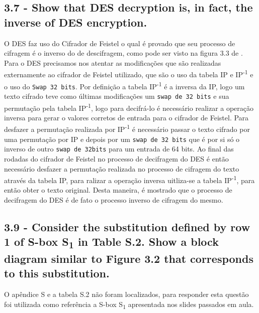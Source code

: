 \documentclass[
    article,            %
    11pt,               %
    oneside,            %
    a4paper,            %
    english,            %
    brazil,             %
    sumario=tradicional,
    ]{abntex2}
\begin{document}
\subsection*{\textbf{3.7 - Show that DES decryption is, in fact, the inverse of DES encryption.}}

O DES faz uso do Cifrador de Feistel o qual é provado que seu processo de cifragem é o inverso do de descifragem, como pode ser visto na figura 3.3 de \cite{Stallings:2005:CNS:1076613}. Para o DES precisamos nos atentar as modificações que são realizadas externamente ao cifrador de Feistel utilizado, que são o uso da tabela IP e IP\textsuperscript{-1} e o uso do \texttt{Swap 32 bits}. Por definição a tabela IP\textsuperscript{-1} é a inversa da IP, logo um texto cifrado teve como últimas modificações um \texttt{swap de 32 bits} e sua permutação pela tabela IP\textsuperscript{-1}, logo para decifrá-lo é necessário realizar a operação inversa para gerar o valores corretos de entrada para o cifrador de Feistel. Para desfazer a permutação realizada por IP\textsuperscript{-1} é necessário passar o texto cifrado por uma permutação por IP e depois por um \texttt{swap de 32 bits} que é por si só o inverso de outro \texttt{swap de 32bits} para um entrada de 64 bits. Ao final das rodadas do cifrador de Feistel no processo de decifragem do DES é então necessário desfazer a permutação realizada no processo de cifragem do texto através da tabela IP, para ralizar a operação inversa uitliza-se a tabela IP\textsuperscript{-1}, para então obter o texto original. Desta maneira, é mostrado que o processo de decifragem do DES é de fato o processo inverso de cifragem do mesmo. 

\subsection*{\textbf{3.9 - Consider the substitution defined by row 1 of S-box S\textsubscript{1} in Table S.2. Show a block diagram similar to Figure 3.2 that corresponds to this substitution.}}

O apêndice S e a tabela S.2 não foram localizados, para responder esta questão foi utilizada como referência a S-box S\textsubscript{1} apresentada nos slides passados em aula.
\end{document}

